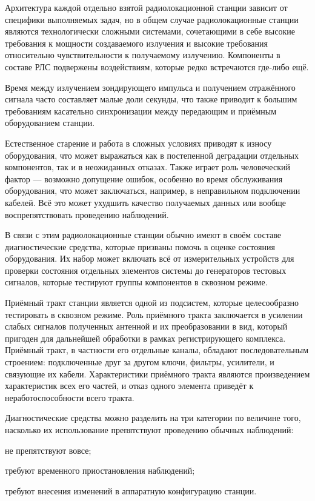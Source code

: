 \documentclass{report}
\begin{document}
Архитектура каждой отдельно взятой радиолокационной станции зависит от специфики выполняемых задач, но в общем случае радиолокационные станции являются технологически сложными системами, сочетающими в себе высокие требования к мощности создаваемого излучения и высокие требования относительно чувствительности к получаемому излучению. Компоненты в составе РЛС подвержены воздействиям, которые редко встречаются где-либо ещё.

Время между излучением зондирующего импульса и получением отражённого сигнала часто составляет малые доли секунды, что также приводит к большим требованиям касательно синхронизации между передающим и приёмным оборудованием станции.

Естественное старение и работа в сложных условиях приводят к износу оборудования, что может выражаться как в постепенной деградации отдельных компонентов, так и в неожиданных отказах. Также играет роль человеческий фактор --- возможно допущение ошибок, особенно во время обслуживания оборудования, что может заключаться, например, в неправильном подключении кабелей. Всё это может ухудшить качество получаемых данных или вообще воспрепятствовать проведению наблюдений.

В связи с этим радиолокационные станции обычно имеют в своём составе диагностические средства, которые призваны помочь в оценке состояния оборудования. Их набор может включать всё от измерительных устройств для проверки состояния отдельных элементов системы до генераторов тестовых сигналов, которые тестируют группы компонентов в сквозном режиме.

Приёмный тракт станции является одной из подсистем, которые целесообразно тестировать в сквозном режиме. Роль приёмного тракта заключается в усилении слабых сигналов полученных антенной и их преобразовании в вид, который пригоден для дальнейшей обработки в рамках регистрирующего комплекса. Приёмный тракт, в частности его отдельные каналы, обладают последовательным строением: подключенные друг за другом ключи, фильтры, усилители, и связующие их кабели. Характеристики приёмного тракта являются произведением характеристик всех его частей, и отказ одного элемента приведёт к неработоспособности всего тракта.

Диагностические средства можно разделить на три категории по величине того, насколько их использование препятствуют проведению обычных наблюдений:

\begin{enummarker}
    \item не препятствуют вовсе;
    \item требуют временного приостановления наблюдений;
    \item требуют внесения изменений в аппаратную конфигурацию станции.
\end{enummarker}
\end{document}
